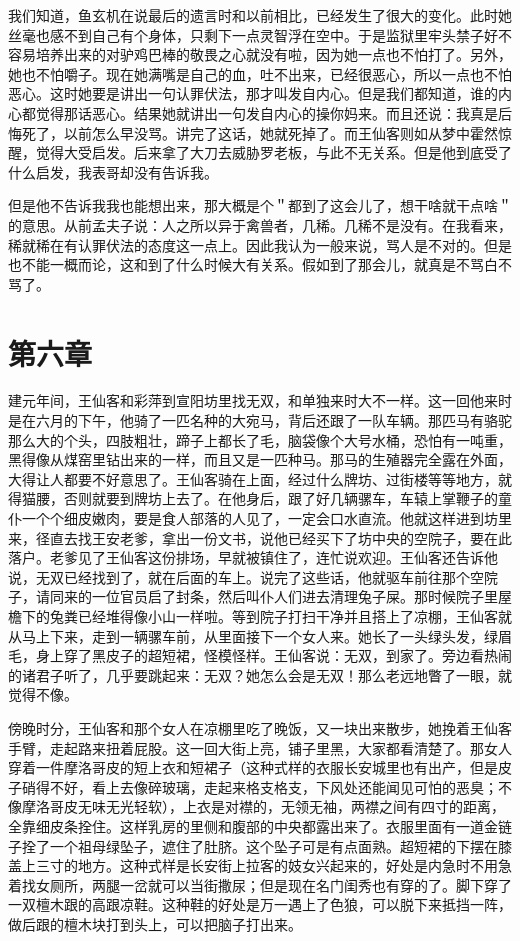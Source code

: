 我们知道，鱼玄机在说最后的遗言时和以前相比，已经发生了很大的变化。此时她丝毫也感不到自己有个身体，只剩下一点灵智浮在空中。于是监狱里牢头禁子好不容易培养出来的对驴鸡巴棒的敬畏之心就没有啦，因为她一点也不怕打了。另外，她也不怕嚼子。现在她满嘴是自己的血，吐不出来，已经很恶心，所以一点也不怕恶心。这时她要是讲出一句认罪伏法，那才叫发自内心。但是我们都知道，谁的内心都觉得那话恶心。结果她就讲出一句发自内心的操你妈来。而且还说：我真是后悔死了，以前怎么早没骂。讲完了这话，她就死掉了。而王仙客则如从梦中霍然惊醒，觉得大受启发。后来拿了大刀去威胁罗老板，与此不无关系。但是他到底受了什么启发，我表哥却没有告诉我。 

但是他不告诉我我也能想出来，那大概是个＂都到了这会儿了，想干啥就干点啥＂的意思。从前孟夫子说：人之所以异于禽兽者，几稀。几稀不是没有。在我看来，稀就稀在有认罪伏法的态度这一点上。因此我认为一般来说，骂人是不对的。但是也不能一概而论，这和到了什么时候大有关系。假如到了那会儿，就真是不骂白不骂了。

\section{第六章}

建元年间，王仙客和彩萍到宣阳坊里找无双，和单独来时大不一样。这一回他来时是在六月的下午，他骑了一匹名种的大宛马，背后还跟了一队车辆。那匹马有骆驼那么大的个头，四肢粗壮，蹄子上都长了毛，脑袋像个大号水桶，恐怕有一吨重，黑得像从煤窑里钻出来的一样，而且又是一匹种马。那马的生殖器完全露在外面，大得让人都要不好意思了。王仙客骑在上面，经过什么牌坊、过街楼等等地方，就得猫腰，否则就要到牌坊上去了。在他身后，跟了好几辆骡车，车辕上掌鞭子的童仆一个个细皮嫩肉，要是食人部落的人见了，一定会口水直流。他就这样进到坊里来，径直去找王安老爹，拿出一份文书，说他已经买下了坊中央的空院子，要在此落户。老爹见了王仙客这份排场，早就被镇住了，连忙说欢迎。王仙客还告诉他说，无双已经找到了，就在后面的车上。说完了这些话，他就驱车前往那个空院子，请同来的一位官员启了封条，然后叫仆人们进去清理兔子屎。那时候院子里屋檐下的兔粪已经堆得像小山一样啦。等到院子打扫干净并且搭上了凉棚，王仙客就从马上下来，走到一辆骡车前，从里面接下一个女人来。她长了一头绿头发，绿眉毛，身上穿了黑皮子的超短裙，怪模怪样。王仙客说：无双，到家了。旁边看热闹的诸君子听了，几乎要跳起来：无双？她怎么会是无双！那么老远地瞥了一眼，就觉得不像。 

傍晚时分，王仙客和那个女人在凉棚里吃了晚饭，又一块出来散步，她挽着王仙客手臂，走起路来扭着屁股。这一回大街上亮，铺子里黑，大家都看清楚了。那女人穿着一件摩洛哥皮的短上衣和短裙子（这种式样的衣服长安城里也有出产，但是皮子硝得不好，看上去像碎玻璃，走起来格支格支，下风处还能闻见可怕的恶臭；不像摩洛哥皮无味无光轻软），上衣是对襟的，无领无袖，两襟之间有四寸的距离，全靠细皮条拴住。这样乳房的里侧和腹部的中央都露出来了。衣服里面有一道金链子拴了一个祖母绿坠子，遮住了肚脐。这个坠子可是有点面熟。超短裙的下摆在膝盖上三寸的地方。这种式样是长安街上拉客的妓女兴起来的，好处是内急时不用急着找女厕所，两腿一岔就可以当街撒尿；但是现在名门闺秀也有穿的了。脚下穿了一双檀木跟的高跟凉鞋。这种鞋的好处是万一遇上了色狼，可以脱下来抵挡一阵，做后跟的檀木块打到头上，可以把脑子打出来。 


